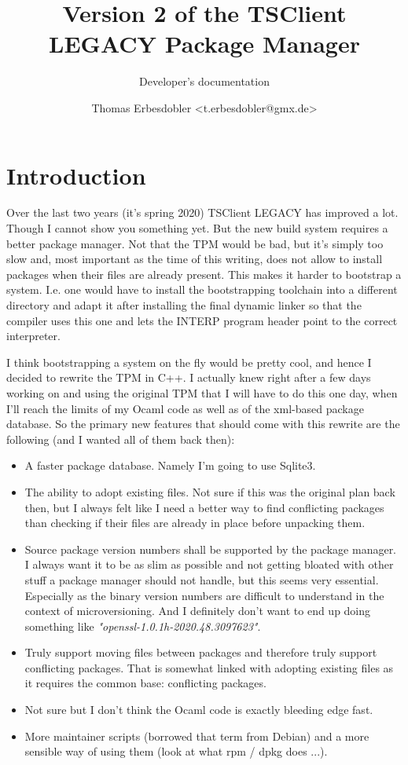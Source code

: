 \documentclass[a4paper]{scrartcl}
\title{Version 2 of the TSClient LEGACY Package Manager}
\subtitle{Developer's documentation}
\author{Thomas Erbesdobler <t.erbesdobler@gmx.de>}
\begin{document}
	\maketitle
	\tableofcontents
	
	
	\section{Introduction}
	\label{sec:introduction}
	
	Over the last two years (it's spring 2020) TSClient LEGACY has improved a lot. Though I cannot show you something yet. But the new build system requires a better package manager. Not that the TPM would be bad, but it's simply too slow and, most important as the time of this writing, does not allow to install packages when their files are already present. This makes it harder to bootstrap a system. I.e. one would have to install the bootstrapping toolchain into a different directory and adapt it after installing the final dynamic linker so that the compiler uses this one and lets the INTERP program header point to the correct interpreter.
	
	I think bootstrapping a system on the fly would be pretty cool, and hence I decided to rewrite the TPM in C++. I actually knew right after a few days working on and using the original TPM that I will have to do this one day, when I'll reach the limits of my Ocaml code as well as of the xml-based package database. So the primary new features that should come with this rewrite are the following (and I wanted all of them back then):
	
	\begin{itemize}
		\item A faster package database. Namely I'm going to use Sqlite3.
		\item The ability to adopt existing files. Not sure if this was the original plan back then, but I always felt like I need a better way to find conflicting packages than checking if their files are already in place before unpacking them.
		\item Source package version numbers shall be supported by the package manager. I always want it to be as slim as possible and not getting bloated with other stuff a package manager should not handle, but this seems very essential. Especially as the binary version numbers are difficult to understand in the context of microversioning. And I definitely don't want to end up doing something like \textit{"openssl-1.0.1h-2020.48.3097623"}.
		\item Truly support moving files between packages and therefore truly support conflicting packages. That is somewhat linked with adopting existing files as it requires the common base: conflicting packages.
		\item Not sure but I don't think the Ocaml code is exactly bleeding edge fast.
		\item More maintainer scripts (borrowed that term from Debian) and a more sensible way of using them (look at what rpm / dpkg does ...).
	\end{itemize}
\end{document}
